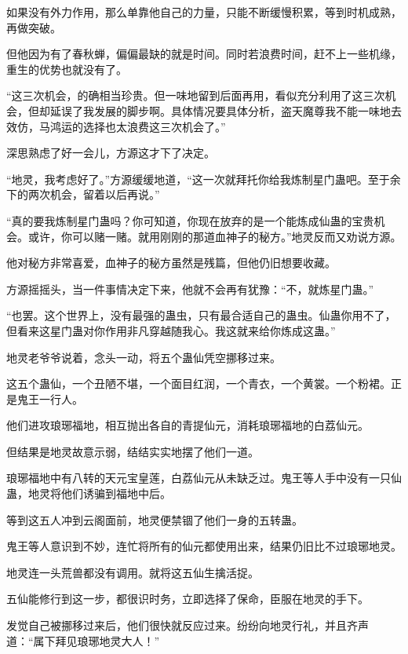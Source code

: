 
\begin{this_body}

如果没有外力作用，那么单靠他自己的力量，只能不断缓慢积累，等到时机成熟，再做突破。

但他因为有了春秋蝉，偏偏最缺的就是时间。同时若浪费时间，赶不上一些机缘，重生的优势也就没有了。

“这三次机会，的确相当珍贵。但一味地留到后面再用，看似充分利用了这三次机会，但却延误了我发展的脚步啊。具体情况要具体分析，盗天魔尊我不能一味地去效仿，马鸿运的选择也太浪费这三次机会了。”

深思熟虑了好一会儿，方源这才下了决定。

“地灵，我考虑好了。”方源缓缓地道，“这一次就拜托你给我炼制星门蛊吧。至于余下的两次机会，留着以后再说。”

“真的要我炼制星门蛊吗？你可知道，你现在放弃的是一个能炼成仙蛊的宝贵机会。或许，你可以赌一赌。就用刚刚的那道血神子的秘方。”地灵反而又劝说方源。

他对秘方非常喜爱，血神子的秘方虽然是残篇，但他仍旧想要收藏。

方源摇摇头，当一件事情决定下来，他就不会再有犹豫：“不，就炼星门蛊。”

“也罢。这个世界上，没有最强的蛊虫，只有最合适自己的蛊虫。仙蛊你用不了，但看来这星门蛊对你作用非凡穿越随我心。我这就来给你炼成这蛊。”

地灵老爷爷说着，念头一动，将五个蛊仙凭空挪移过来。

这五个蛊仙，一个丑陋不堪，一个面目红润，一个青衣，一个黄裳。一个粉裙。正是鬼王一行人。

他们进攻琅琊福地，相互抛出各自的青提仙元，消耗琅琊福地的白荔仙元。

但结果是地灵故意示弱，结结实实地摆了他们一道。

琅琊福地中有八转的天元宝皇莲，白荔仙元从未缺乏过。鬼王等人手中没有一只仙蛊，地灵将他们诱骗到福地中后。

等到这五人冲到云阁面前，地灵便禁锢了他们一身的五转蛊。

鬼王等人意识到不妙，连忙将所有的仙元都使用出来，结果仍旧比不过琅琊地灵。

地灵连一头荒兽都没有调用。就将这五仙生擒活捉。

五仙能修行到这一步，都很识时务，立即选择了保命，臣服在地灵的手下。

发觉自己被挪移过来后，他们很快就反应过来。纷纷向地灵行礼，并且齐声道：“属下拜见琅琊地灵大人！”


\end{this_body}
